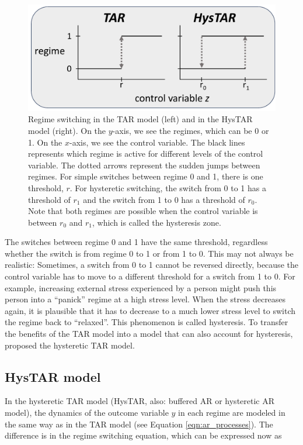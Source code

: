 \documentclass{article}
\begin{document}
\begin{figure}
\centering
\includegraphics[scale=0.4]{simple_vs_hysteretic_2}
\caption{Regime switching in the TAR model (left) and in the HysTAR model (right). On the $y$-axis, we see the regimes, which can be 0 or 1. On the $x$-axis, we see the control variable. 
The black lines represents which regime is active for different levels of the control variable. The dotted arrows represent the sudden jumps between regimes.
For simple switches between regime 0 and 1, there is one threshold, $r$. For hysteretic switching, the switch from 0 to 1 has a threshold of $r_1$ and the switch from 1 to 0 has a threshold of $r_0$. Note that both regimes are possible when the control variable is between $r_0$ and $r_1$, which is called the hysteresis zone.}
\label{fig:simple_vs_hysteretic_2}
\end{figure}

The switches between regime 0 and 1 have the same threshold, regardless whether the switch is from regime 0 to 1 or from 1 to 0. 
This may not always be realistic: Sometimes, a switch from 0 to 1 cannot be reversed directly, because the control variable has to move to a different threshold  for a switch from 1 to 0.
For example, increasing external stress experienced by a person might push this person into a ``panick'' regime at a high stress level.
When the stress decreases again, it is plausible that it has to decrease to a much lower stress level to switch the regime back to ``relaxed''.
This phenomenon is called hysteresis.
To transfer the benefits of the TAR model into a model that can also account for hysteresis, \citet{bar2} proposed the hysteretic TAR model.

\subsection{HysTAR model}
In the hysteretic TAR model (HysTAR, also: buffered AR or hysteretic AR model), the dynamics of the outcome variable $y$ in each regime are modeled in the same way as in the TAR model (see Equation \ref{eqn:ar_processes}). The difference is in the regime switching equation, which can be expressed now as
\end{document}
